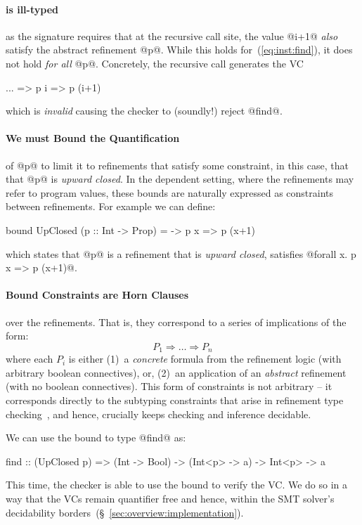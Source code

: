 \paragraph{ is ill-typed} as the signature requires that 
at the recursive call site, the value @i+1@ \emph{also} 
satisfy the abstract refinement @p@. While this holds 
for~(\ref{eq:inst:find}), it does not hold \emph{for all} @p@. 
Concretely, the recursive call generates the VC
%
\begin{code}
    ... => p i => p (i+1)
\end{code}
%
%
which is \emph{invalid} causing the checker to (soundly!) reject @find@.

\paragraph{We must Bound the Quantification} of @p@ to limit 
it to refinements that satisfy some constraint, in this case, 
that that @p@ is \emph{upward closed}. In the dependent setting,
where the refinements may refer to program values, these bounds 
are naturally expressed as constraints between refinements.
%
For example we can define:
%
\begin{code} 
    bound UpClosed (p :: Int -> Prop) 
      = \x -> p x => p (x+1)
\end{code}
%
which states that @p@ is a refinement that is \emph{upward closed}, 
\ie satisfies @forall x. p x =>  p (x+1)@.

\paragraph{Bound Constraints are Horn Clauses} over the refinements. 
That is, they correspond to a series of implications of the 
form: $$P_1 \Rightarrow \ldots \Rightarrow P_n$$ where each $P_i$ 
is either
%
(1)~a \emph{concrete} formula from the refinement logic 
   (with arbitrary boolean connectives), or,
%
(2)~an application of an \emph{abstract} refinement 
   (with no boolean connectives).
%
This form of constraints is not arbitrary -- it corresponds 
directly to the subtyping constraints that arise in refinement
type checking~\cite{HMC}, and hence, crucially keeps checking
and inference decidable.

We can use the bound to type @find@ as:
%
\begin{code}
    find :: (UpClosed p) => (Int -> Bool) 
                         -> (Int<p> -> a) 
                         ->  Int<p> -> a
\end{code}
%
This time, the checker is able to use the bound to 
verify the VC. We do so in a way that the VCs remain 
quantifier free and hence, within the SMT solver's 
decidability borders~(\S~\ref{sec:overview:implementation}).

